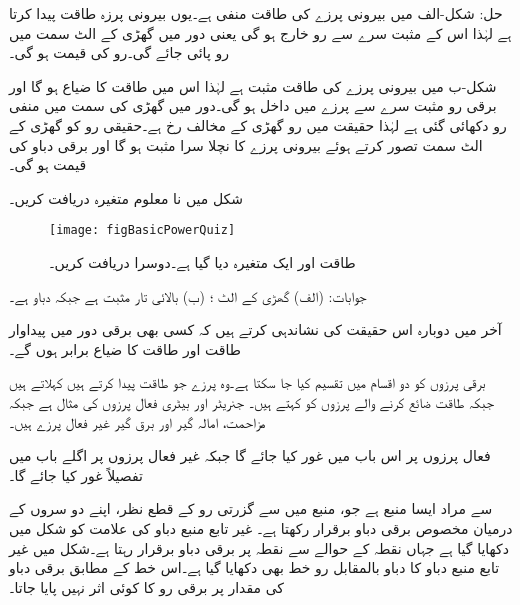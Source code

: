 حل: شکل-الف میں بیرونی پرزے کی طاقت منفی ہے۔یوں بیرونی پرزہ طاقت پیدا کرتا ہے لہٰذا اس کے مثبت سرے سے رو خارج ہو گی یعنی دور میں گھڑی کے الٹ سمت میں رو پائی جائے گی۔رو کی قیمت  ہو گی۔

شکل-ب میں بیرونی پرزے کی طاقت مثبت ہے لہٰذا اس میں طاقت کا ضیاع ہو گا اور برقی رو مثبت سرے سے پرزے میں داخل ہو گی۔دور میں گھڑی کی سمت میں منفی رو دکھائی گئی ہے لہٰذا حقیقت میں رو گھڑی کے مخالف رخ ہے۔حقیقی رو کو گھڑی کے الٹ سمت تصور کرتے ہوئے  بیرونی پرزے کا نچلا سرا مثبت ہو گا اور برقی دباو کی قیمت  ہو گی۔

شکل  میں نا معلوم متغیرہ دریافت کریں۔ 
\begin{figure}
\centering
\texttt{[image: figBasicPowerQuiz]}
\caption{طاقت اور ایک متغیرہ دیا گیا ہے۔دوسرا دریافت کریں۔}
\label{شکل_بنیادی_طاقت_مشق}
\end{figure}

جوابات: (الف) گھڑی کے الٹ ؛ (ب) بالائی تار مثبت ہے جبکہ دباو  ہے۔  

آخر میں دوبارہ اس حقیقت کی نشاندہی کرتے ہیں کہ کسی بھی برقی دور میں پیداوار طاقت اور طاقت کا ضیاع برابر ہوں گے۔

برقی پرزوں کو دو اقسام میں تقسیم کیا جا سکتا ہے۔وہ پرزے جو طاقت پیدا کرتے ہیں  کہلاتے ہیں جبکہ طاقت ضائع کرنے والے پرزوں کو  کہتے ہیں۔ جنریٹر اور بیٹری فعال پرزوں کی مثال ہے جبکہ مزاحمت، امالہ گیر اور برق گیر غیر فعال پرزے ہیں۔

فعال پرزوں پر اس باب میں غور کیا جائے گا جبکہ غیر فعال پرزوں پر اگلے باب میں تفصیلاً غور کیا جائے گا۔ 

 سے مراد ایسا منبع ہے جو، منبع میں سے گزرتی رو کے قطع نظر، اپنے دو سروں کے درمیان مخصوص برقی دباو برقرار رکھتا ہے۔ غیر تابع منبع دباو کی علامت کو شکل  میں دکھایا گیا ہے جہاں نقطہ  کے حوالے سے نقطہ  پر  برقی دباو برقرار رہتا ہے۔شکل میں غیر تابع منبع دباو کا دباو بالمقابل رو   خط بھی دکھایا گیا ہے۔اس خط کے مطابق برقی دباو کی مقدار پر برقی رو کا کوئی اثر نہیں پایا جاتا۔

